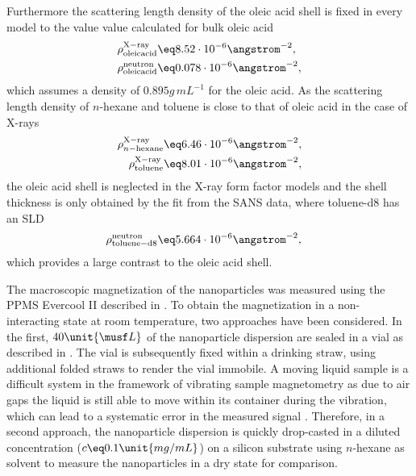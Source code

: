 \documentclass[\main/dresen_thesis.tex]{subfiles}
\begin{document}
    Furthermore the scattering length density of the oleic acid shell is fixed in every model to the value value calculated for bulk oleic acid
    \begin{align}
      \rho^\mathrm{X-ray}_\mathrm{oleic acid} &\eq 8.52 \cdot 10^{-6} \angstrom^{-2},\\
      \rho^\mathrm{neutron}_\mathrm{oleic acid} &\eq 0.078 \cdot 10^{-6} \angstrom^{-2},
    \end{align}
    which assumes a density of $0.895 \unit{g\,mL^{-1}}$ for the oleic acid.
    As the scattering length density of $\mathit{n}$-hexane and toluene is close to that of oleic acid in the case of X-rays
    \begin{align}
      \rho^\mathrm{X-ray}_{n\mathrm{-hexane}} &\eq 6.46 \cdot 10^{-6} \angstrom^{-2},\\
      \rho^\mathrm{X-ray}_\mathrm{toluene} &\eq 8.01 \cdot 10^{-6} \angstrom^{-2},
    \end{align}
    the oleic acid shell is neglected in the X-ray form factor models and the shell thickness is only obtained by the fit from the SANS data, where toluene-d8 has an SLD
    \begin{align}
      \rho^\mathrm{neutron}_\mathrm{toluene-d8} &\eq 5.664 \cdot 10^{-6} \angstrom^{-2},
    \end{align}
    which provides a large contrast to the oleic acid shell.

    The macroscopic magnetization of the nanoparticles was measured using the PPMS Evercool II described in .
    To obtain the magnetization in a non-interacting state at room temperature, two approaches have been considered.
    In the first, $40 \unit{\musf L}$ of the nanoparticle dispersion are sealed in a vial as described in .
    The vial is subsequently fixed within a drinking straw, using additional folded straws to render the vial immobile.
    A moving liquid sample is a difficult system in the framework of vibrating sample magnetometry as due to air gaps the liquid is still able to move within its container during the vibration, which can lead to a systematic error in the measured signal \cite{Boekelheide_2016_Artif}.
    Therefore, in a second approach, the nanoparticle dispersion is quickly drop-casted in a diluted concentration ($c \eq 0.1 \unit{mg/mL}$) on a silicon substrate using $\textit{n}$-hexane as solvent to measure the nanoparticles in a dry state for comparison.
\end{document}
